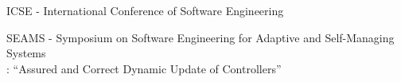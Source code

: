 \item[2016] ICSE - International Conference of  Software Engineering\\

\item[2016] SEAMS - Symposium on Software Engineering for Adaptive and Self-Managing Systems\\
    :
``Assured and Correct Dynamic Update of Controllers''
